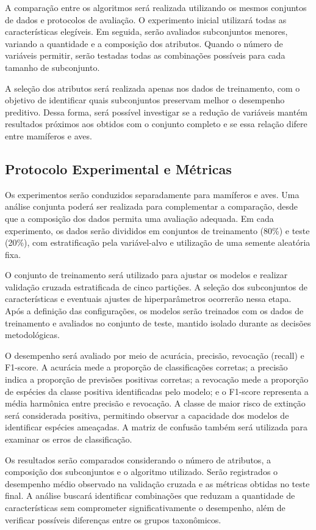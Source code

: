\documentclass[conference]{IEEEtran}
\begin{document}
A comparação entre os algoritmos será realizada utilizando os mesmos conjuntos de dados e protocolos de avaliação. O experimento inicial utilizará todas as características elegíveis. Em seguida, serão avaliados subconjuntos menores, variando a quantidade e a composição dos atributos. Quando o número de variáveis permitir, serão testadas todas as combinações possíveis para cada tamanho de subconjunto.

A seleção dos atributos será realizada apenas nos dados de treinamento, com o objetivo de identificar quais subconjuntos preservam melhor o desempenho preditivo. Dessa forma, será possível investigar se a redução de variáveis mantém resultados próximos aos obtidos com o conjunto completo e se essa relação difere entre mamíferos e aves.

\subsection{Protocolo Experimental e Métricas}

Os experimentos serão conduzidos separadamente para mamíferos e aves. Uma análise conjunta poderá ser realizada para complementar a comparação, desde que a composição dos dados permita uma avaliação adequada. Em cada experimento, os dados serão divididos em conjuntos de treinamento (80\%) e teste (20\%), com estratificação pela variável-alvo e utilização de uma semente aleatória fixa.

O conjunto de treinamento será utilizado para ajustar os modelos e realizar validação cruzada estratificada de cinco partições. A seleção dos subconjuntos de características e eventuais ajustes de hiperparâmetros ocorrerão nessa etapa. Após a definição das configurações, os modelos serão treinados com os dados de treinamento e avaliados no conjunto de teste, mantido isolado durante as decisões metodológicas.

O desempenho será avaliado por meio de acurácia, precisão, revocação (recall) e F1-score. A acurácia mede a proporção de classificações corretas; a precisão indica a proporção de previsões positivas corretas; a revocação mede a proporção de espécies da classe positiva identificadas pelo modelo; e o F1-score representa a média harmônica entre precisão e revocação. A classe de maior risco de extinção será considerada positiva, permitindo observar a capacidade dos modelos de identificar espécies ameaçadas. A matriz de confusão também será utilizada para examinar os erros de classificação.

Os resultados serão comparados considerando o número de atributos, a composição dos subconjuntos e o algoritmo utilizado. Serão registrados o desempenho médio observado na validação cruzada e as métricas obtidas no teste final. A análise buscará identificar combinações que reduzam a quantidade de características sem comprometer significativamente o desempenho, além de verificar possíveis diferenças entre os grupos taxonômicos.
\end{document}
